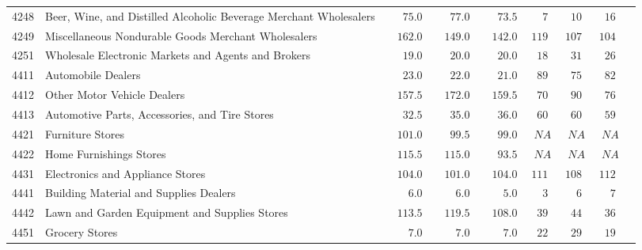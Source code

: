\documentclass[9pt, oneside]{article}   	%
\begin{document}
\begin{longtable}{lp{3.5 in}ccccccc}
4248  & Beer, Wine, and Distilled Alcoholic Beverage Merchant Wholesalers & $\phantom{000}75.0$ & $\phantom{000}77.0$ & $\phantom{000}73.5$ & $\phantom{00}7$ & $\phantom{0}10$ & $\phantom{0}16$ \\
4249  & Miscellaneous Nondurable Goods Merchant Wholesalers & $\phantom{00}162.0$ & $\phantom{00}149.0$ & $\phantom{00}142.0$ & $119$ & $107$ & $104$ \\
4251  & Wholesale Electronic Markets and Agents and Brokers & $\phantom{000}19.0$ & $\phantom{000}20.0$ & $\phantom{000}20.0$ & $\phantom{0}18$ & $\phantom{0}31$ & $\phantom{0}26$ \\
4411  & Automobile Dealers & $\phantom{000}23.0$ & $\phantom{000}22.0$ & $\phantom{000}21.0$ & $\phantom{0}89$ & $\phantom{0}75$ & $\phantom{0}82$ \\
4412  & Other Motor Vehicle Dealers & $\phantom{00}157.5$ & $\phantom{00}172.0$ & $\phantom{00}159.5$ & $\phantom{0}70$ & $\phantom{0}90$ & $\phantom{0}76$ \\
4413  & Automotive Parts, Accessories, and Tire Stores & $\phantom{000}32.5$ & $\phantom{000}35.0$ & $\phantom{000}36.0$ & $\phantom{0}60$ & $\phantom{0}60$ & $\phantom{0}59$ \\
4421  & Furniture Stores & $\phantom{00}101.0$ & $\phantom{000}99.5$ & $\phantom{000}99.0$ & $\phantom{0}NA$ & $\phantom{0}NA$ & $\phantom{0}NA$ \\
4422  & Home Furnishings Stores & $\phantom{00}115.5$ & $\phantom{00}115.0$ & $\phantom{000}93.5$ & $\phantom{0}NA$ & $\phantom{0}NA$ & $\phantom{0}NA$ \\
4431  & Electronics and Appliance Stores & $\phantom{00}104.0$ & $\phantom{00}101.0$ & $\phantom{00}104.0$ & $111$ & $108$ & $112$ \\
4441  & Building Material and Supplies Dealers & $\phantom{0000}6.0$ & $\phantom{0000}6.0$ & $\phantom{0000}5.0$ & $\phantom{00}3$ & $\phantom{00}6$ & $\phantom{00}7$ \\
4442  & Lawn and Garden Equipment and Supplies Stores & $\phantom{00}113.5$ & $\phantom{00}119.5$ & $\phantom{00}108.0$ & $\phantom{0}39$ & $\phantom{0}44$ & $\phantom{0}36$ \\
4451  & Grocery Stores & $\phantom{0000}7.0$ & $\phantom{0000}7.0$ & $\phantom{0000}7.0$ & $\phantom{0}22$ & $\phantom{0}29$ & $\phantom{0}19$ \\

\end{longtable}
\end{document}
